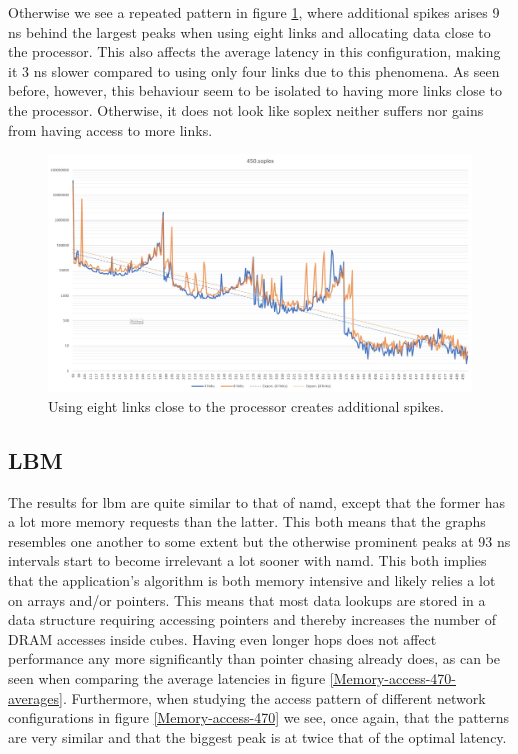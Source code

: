 Otherwise we see a repeated pattern in figure \ref{Memory-access-450-2-dev-4-8-links}, where additional spikes arises 9 ns behind the largest peaks when using eight links and allocating data close to the processor. This also affects the average latency in this configuration, making it 3 ns slower compared to using only four links due to this phenomena. As seen before, however, this behaviour seem to be isolated to having more links close to the processor. Otherwise, it does not look like soplex neither suffers nor gains from having access to more links. 

\begin{figure}[!ht]
    \centering
    \includegraphics[width=0.75\linewidth]{figure/450-2_4-8.jpg}
    \caption{Using eight links close to the processor creates additional spikes.}
    \label{Memory-access-450-2-dev-4-8-links}
\end{figure}

\subsection{LBM}
The results for lbm are quite similar to that of namd, except that the former has a lot more memory requests than the latter. This both means that the graphs resembles one another to some extent but the otherwise prominent peaks at 93 ns intervals start to become irrelevant a lot sooner with namd. This both implies that the application's algorithm is both memory intensive and likely relies a lot on arrays and/or pointers. This means that most data lookups are stored in a data structure requiring accessing pointers and thereby increases the number of DRAM accesses inside cubes. Having even longer hops does not affect performance any more significantly than pointer chasing already does, as can be seen when comparing the average latencies in figure \ref{Memory-access-470-averages}. Furthermore, when studying the access pattern of different network configurations in figure \ref{Memory-access-470} we see, once again, that the patterns are very similar and that the biggest peak is at twice that of the optimal latency.
\bigskip

